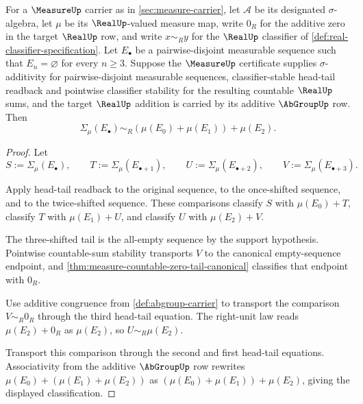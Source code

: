\begin{theorem}
\label{thm:measure-finite-three-support-countable-readback}
For a $\MeasureUp$ carrier as in \autoref{sec:measure-carrier}, let $\mathcal{A}$ be its designated $\sigma$-algebra, let $\mu$ be its $\RealUp$-valued measure map, write $0_R$ for the additive zero in the target $\RealUp$ row, and write $x\sim_R y$ for the $\RealUp$ classifier of \autoref{def:real-classifier-specification}. Let $E_\bullet$ be a pairwise-disjoint measurable sequence such that $E_n=\varnothing$ for every $n\geq3$. Suppose the $\MeasureUp$ certificate supplies $\sigma$-additivity for pairwise-disjoint measurable sequences, classifier-stable head-tail readback and pointwise classifier stability for the resulting countable $\RealUp$ sums, and the target $\RealUp$ addition is carried by its additive $\AbGroupUp$ row. Then
$$
\Sigma_\mu(E_\bullet)\sim_R(\mu(E_0)+\mu(E_1))+\mu(E_2).
$$
\end{theorem}
\begin{proof}
Let
$$
S:=\Sigma_\mu(E_\bullet),\qquad
T:=\Sigma_\mu(E_{\bullet+1}),\qquad
U:=\Sigma_\mu(E_{\bullet+2}),\qquad
V:=\Sigma_\mu(E_{\bullet+3}).
$$

Apply head-tail readback to the original sequence, to the once-shifted sequence, and to the twice-shifted sequence. These comparisons classify $S$ with $\mu(E_0)+T$, classify $T$ with $\mu(E_1)+U$, and classify $U$ with $\mu(E_2)+V$.

The three-shifted tail is the all-empty sequence by the support hypothesis. Pointwise countable-sum stability transports $V$ to the canonical empty-sequence endpoint, and \autoref{thm:measure-countable-zero-tail-canonical} classifies that endpoint with $0_R$.

Use additive congruence from \autoref{def:abgroup-carrier} to transport the comparison $V\sim_R0_R$ through the third head-tail equation. The right-unit law reads $\mu(E_2)+0_R$ as $\mu(E_2)$, so $U\sim_R\mu(E_2)$.

Transport this comparison through the second and first head-tail equations. Associativity from the additive $\AbGroupUp$ row rewrites $\mu(E_0)+(\mu(E_1)+\mu(E_2))$ as $(\mu(E_0)+\mu(E_1))+\mu(E_2)$, giving the displayed classification.
\end{proof}

